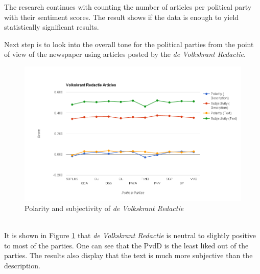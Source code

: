 The research continues with counting the number of articles per political party with their sentiment scores. The result shows if the data is enough to yield statistically significant results.

Next step is to look into the overall tone for the political parties from the point of view of the newspaper using articles posted by the {\it de Volkskrant Redactie}.
    \begin{figure}[ht]
        \centering
        \includegraphics[scale=0.28]{Graphs/VolkskrantRedactieV2}
        \caption{Polarity and subjectivity of {\it de Volkskrant Redactie}}
        \label{fig:volkskrantr}
    \end{figure}
    \\
It is shown in Figure \ref{fig:volkskrantr} that {\it de Volkskrant Redactie} is neutral to slightly positive to most of the parties. One can see that the PvdD is the least liked out of the parties. The results also display that the text is much more subjective than the description.

